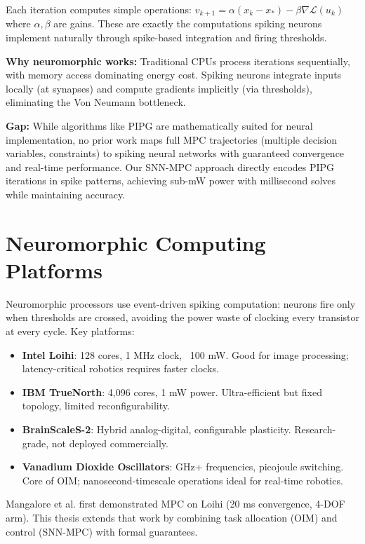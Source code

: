 Each iteration computes simple operations: $v_{k+1} = \alpha(x_k - x_*) - \beta \nabla \mathcal{L}(u_k)$ where $\alpha, \beta$ are gains. These are exactly the computations spiking neurons implement naturally through spike-based integration and firing thresholds.

\textbf{Why neuromorphic works:} Traditional CPUs process iterations sequentially, with memory access dominating energy cost. Spiking neurons integrate inputs locally (at synapses) and compute gradients implicitly (via thresholds), eliminating the Von Neumann bottleneck.

\textbf{Gap:} While algorithms like PIPG are mathematically suited for neural implementation, no prior work maps full MPC trajectories (multiple decision variables, constraints) to spiking neural networks with guaranteed convergence and real-time performance. Our SNN-MPC approach directly encodes PIPG iterations in spike patterns, achieving sub-mW power with millisecond solves while maintaining accuracy.

\section{Neuromorphic Computing Platforms}

Neuromorphic processors use event-driven spiking computation: neurons fire only when thresholds are crossed, avoiding the power waste of clocking every transistor at every cycle. Key platforms:

\begin{itemize}
\item \textbf{Intel Loihi}: 128 cores, 1 MHz clock, ~100 mW. Good for image processing; latency-critical robotics requires faster clocks.
\item \textbf{IBM TrueNorth}: 4,096 cores, 1 mW power. Ultra-efficient but fixed topology, limited reconfigurability.
\item \textbf{BrainScaleS-2}: Hybrid analog-digital, configurable plasticity. Research-grade, not deployed commercially.
\item \textbf{Vanadium Dioxide Oscillators}: GHz+ frequencies, picojoule switching. Core of OIM; nanosecond-timescale operations ideal for real-time robotics.
\end{itemize}

Mangalore et al. \cite{Mangalore2024} first demonstrated MPC on Loihi (20 ms convergence, 4-DOF arm). This thesis extends that work by combining task allocation (OIM) and control (SNN-MPC) with formal guarantees.

